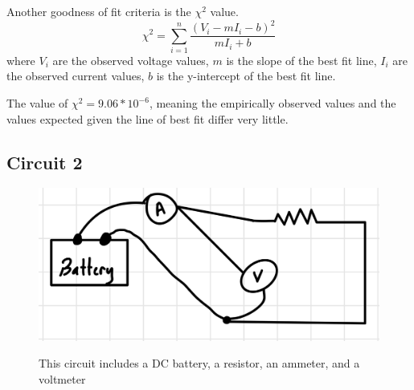 \documentclass[12pt]{article}
\begin{document}
Another goodness of fit criteria is the $\chi^2$ value.
\begin{equation}
    \chi^2 = \sum_{i=1}^{n} \frac{(V_i - mI_i - b)^2}{mI_i + b}
\end{equation}
where $V_i$ are the observed voltage values, $m$ is the slope of the best fit line, $I_i$ are the observed current values, $b$ is the y-intercept of the best fit line.

The value of $\chi^2 = 9.06*10^{-6}$, meaning the empirically observed values and the values expected given the line of best fit differ very little.

\subsection*{Circuit 2}

\begin{figure}[H]
    \begin{centering}
    \includegraphics[width=0.5 \textwidth]{img/c_2.jpeg}
    \label{fig:another}
    \caption{This circuit includes a DC battery, a resistor, an ammeter, and a voltmeter}
    \end{centering}
\end{figure}
\end{document}
